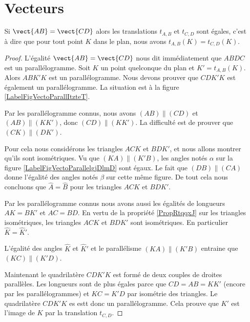 \section{Vecteurs}

\begin{propriete}
    Si \( \vect{ AB }=\vect{ CD }\) alors les translations \( t_{A,B}\) et \( t_{C,D}\) sont égales, c'est à dire que pour tout point \( K\) dans le plan, nous avons \( t_{A,B}(K)=t_{C,D}(K)\).
\end{propriete}

\begin{proof}
    L'égalité \( \vect{ AB }=\vect{ CD }\) nous dit immédiatement que \( ABDC\) est un parallélogramme. Soit \( K\) un point quelconque du plan et \( K'=t_{A,B}(K)\). Alors \( ABK'K\) est un parallélogramme. Nous devons prouver que \( CDK'K\) est également un parallélogramme. La situation est à la figure \ref{LabelFigVectoParallItzteT}. %
\newcommand{\CaptionFigVectoParallItzteT}{Nous savons que \( ABDC\) et \( CDK'K\) sont des parallélogramme, et nous voulons déduire que \( CDK'K\) en est également un.}


    Par les parallélogramme connus, nous avons \( (AB)\parallel (CD)\) et \( (AB)\parallel (KK')\), donc \( (CD)\parallel (KK')\). La difficulté est de prouver que \( (CK)\parallel (DK')\). 
    
    Pour cela nous considérons les triangles \( ACK\) et \( BDK'\), et nous allons montrer qu'ils sont isométriques. Vu que \( (KA)\parallel (K'B)\), les angles notés \( \alpha\) sur la figure \ref{LabelFigVectoParallelgjDlmD} sont égaux. Le fait que \( (DB)\parallel (CA)\) donne l'égalité des angles notés \( \beta\) sur cette même figure. De tout cela nous concluons que \( \hat A=\hat B\) pour les triangles \( ACK\) et \( BDK'\).
\newcommand{\CaptionFigVectoParallelgjDlmD}{Égalité de quelque angles.}


    Par les parallélogramme connus nous avons aussi les égalités de longueurs \( AK=BK'\) et \( AC=BD\). En vertu de la propriété \ref{PropRtqqxJ} sur les triangles isométriques, les triangles \( ACK\) et \( BDK'\) sont isométriques. En particulier \( \hat K=\hat K'\).

    L'égalité des angles \( \hat K\) et \( \hat K'\) et le parallélisme \( (KA)\parallel (K'B)\) entraine que \( (KC)\parallel(K'D)\).

    Maintenant le quadrilatère \( CDK'K\) est formé de deux couples de droites parallèles. Les longueurs sont de plus égales parce que \( CD=AB=KK'\) (encore par les parallélogrammes) et \( KC=K'D\) par isométrie des triangles. Le quadrilatère \( CDK'K\) es estt donc un parallélogramme. Cela prouve que \( K'\) est l'image de \( K\) par la translation \( t_{C,D}\).
\end{proof}

